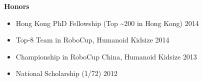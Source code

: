 \documentclass[11pt]{article}
\newcommand{\subsec}[1]{
  \vskip 4pt
  {\bf\large\color{teal}  #1}
  \vskip 1pt
}
\newcommand{\yearat}[1]{
  {\hfill \color{gray} #1}
}
\begin{document}
\begin{minipage}[t]{0.34\textwidth}
  \subsec{Honors}
  \begin{itemize}
    \item Hong Kong PhD Fellowship (Top \~{}200 in Hong Kong) \yearat{2014}
    \item Top-8 Team in RoboCup, Humanoid Kidsize \yearat{2014}
    \item Championship in RoboCup China, Humanoid Kidsize \yearat{2013}
    \item National Scholarship (1/72) \yearat{2012}
  \end{itemize}
\end{minipage}
\end{document}
